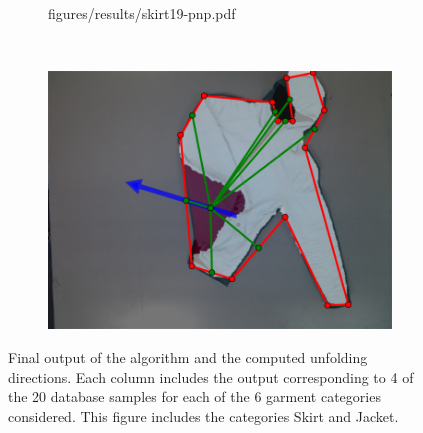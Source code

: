 \begin{figure}[htbp]
\begin{subfigure}[l]{\bigtablewidth}
    	{figures/results/skirt19-pnp.pdf} 
	\end{subfigure}
	~
    \begin{subfigure}[r]{\bigtablewidth}
	    \centering
    	\includegraphics[width=\textwidth]
		{figures/results/jacket13-pnp.pdf}    	
	\end{subfigure}
    \caption[Final output of the algorithm and the computed unfolding directions (Skirt and jacket)]
    {Final output of the algorithm and the computed unfolding directions. Each column includes the output corresponding to 4 of the 20 database samples for each of the 6 garment categories considered. This figure includes the categories Skirt and Jacket.}
    \label{fig:results}
\end{figure}

